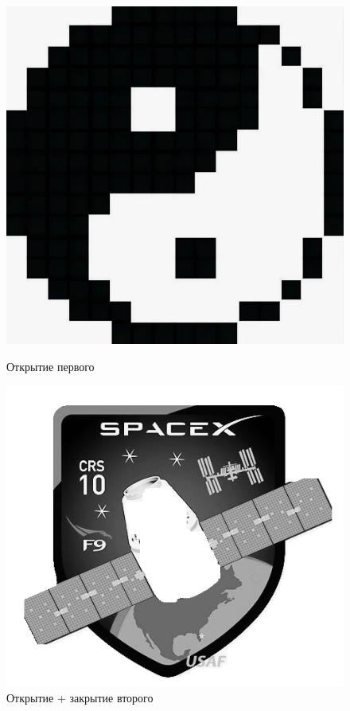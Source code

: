 \begin{figure}[!htb]
    \includegraphics[width=\linewidth]{../img/outputs/morph_filters/pixel_erode_dilate.png}
    \caption{Открытие первого}
    \endminipage\hfill
    \includegraphics[width=\linewidth]{../img/outputs/morph_filters/spaceX_open_close.png}
    \caption{Открытие + закрытие второго}
    \endminipage\hfill
\end{figure}

